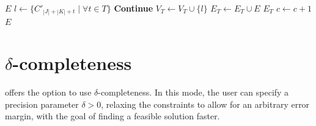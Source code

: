 \documentclass[runningheads]{llncs}
\begin{document}
\begin{algorithm}
\begin{algorithmic}
         
        \State \Return $E$
        \EndIf
        \State $l \gets \{ C'_{|J| + |K| + t} \mid \forall t \in T\}$ %
         
        \State \textbf{Continue}
        \EndIf
        \State $V_T \gets V_T \cup \{l\}$
        \State $E_T \gets E_T \cup E$
         
        \State \Return $E_T$
        \EndIf
        \State $c \gets c + 1$
        \EndWhile
        \State \Return $E$
    \end{algorithmic}
\end{algorithm}

\section{$\delta$-completeness}
\label{sec:delta-completeness}

\dlinear offers the option to use $\delta$-completeness.
In this mode, the user can specify a precision parameter $\delta > 0$, relaxing the constraints to allow for an arbitrary error margin, with the goal of finding a feasible solution faster.
\end{document}

